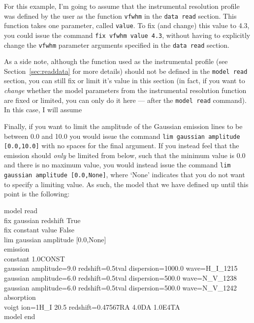 For this example, I'm going to assume that the instrumental resolution profile
was defined by the user as the function \texttt{vfwhm} in the \texttt{data read}
section. This function takes one parameter, called \texttt{value}. To fix (and change)
this value to 4.3, you could issue the command \texttt{fix vfwhm value 4.3}, without
having to explicitly change the \texttt{vfwhm} parameter arguments specified in the
\texttt{data read} section.

As a side note, although the function used as the instrumental profile (see
Section~\ref{sec:readdata} for more details) should not be defined in the
\texttt{model read} section, you can still fix or limit it's value in this section
(in fact, if you want to \textit{change} whether the model parameters from
the instrumental resolution function are fixed or limited, you can only do
it here --- after the \texttt{model read} command). In this case, I will assume

Finally, if you want to limit the amplitude of the Gaussian emission lines
to be between 0.0 and 10.0 you would issue the command
\texttt{lim gaussian amplitude [0.0,10.0]} with no spaces for the final
argument. If you instead feel that the emission should \textit{only} be
limited from below, such that the minimum value is 0.0 and there is
no maximum value, you would instead issue the command
\texttt{lim gaussian amplitude [0.0,None]}, where `None' indicates that
you do not want to specify a limiting value. As such, the model that we
have defined up until this point is the following:

\vspace{0.3cm}
\begin{mdframed}[style=MyFrame]
model read\\
fix gaussian redshift True\\
fix constant value False\\
lim gaussian amplitude [0.0,None]\\
emission\\
constant 1.0CONST\\
gaussian amplitude=9.0 redshift=0.5tval dispersion=1000.0 wave=H\_I\_1215\\
gaussian amplitude=6.0 redshift=0.5tval dispersion=500.0 wave=N\_V\_1238\\
gaussian amplitude=6.0 redshift=0.5tval dispersion=500.0 wave=N\_V\_1242\\
absorption\\
voigt ion=1H\_I    20.5   redshift=0.47567RA    4.0DA   1.0E4TA\\
model end
\end{mdframed}
\vspace{0.2cm}

